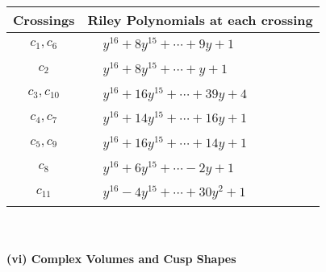 \documentclass[1p]{elsarticle_modified}
\theoremstyle{definition}
\begin{document}
\begin{tabular}{m{50pt}|m{274pt}}
Crossings & \hspace{64pt}Riley Polynomials at each crossing \\
\hline $$\begin{aligned}c_{1},c_{6}\end{aligned}$$&$\begin{aligned}
&y^{16}+8 y^{15}+\cdots+9 y+1
\end{aligned}$\\
\hline $$\begin{aligned}c_{2}\end{aligned}$$&$\begin{aligned}
&y^{16}+8 y^{15}+\cdots+y+1
\end{aligned}$\\
\hline $$\begin{aligned}c_{3},c_{10}\end{aligned}$$&$\begin{aligned}
&y^{16}+16 y^{15}+\cdots+39 y+4
\end{aligned}$\\
\hline $$\begin{aligned}c_{4},c_{7}\end{aligned}$$&$\begin{aligned}
&y^{16}+14 y^{15}+\cdots+16 y+1
\end{aligned}$\\
\hline $$\begin{aligned}c_{5},c_{9}\end{aligned}$$&$\begin{aligned}
&y^{16}+16 y^{15}+\cdots+14 y+1
\end{aligned}$\\
\hline $$\begin{aligned}c_{8}\end{aligned}$$&$\begin{aligned}
&y^{16}+6 y^{15}+\cdots-2 y+1
\end{aligned}$\\
\hline $$\begin{aligned}c_{11}\end{aligned}$$&$\begin{aligned}
&y^{16}-4 y^{15}+\cdots+30 y^2+1
\end{aligned}$\\
\hline
\end{tabular}\\~\\
\newpage\flushleft \textbf{(vi) Complex Volumes and Cusp Shapes}
\end{document}
